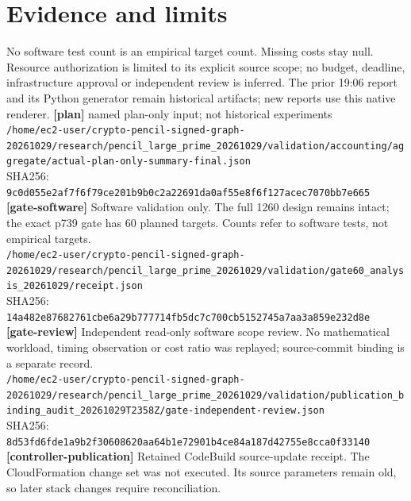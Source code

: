 \documentclass[11pt]{article}
\begin{document}
\section*{Evidence and limits}
No software test count is an empirical target count. Missing costs stay null. Resource authorization is limited to its explicit source scope; no budget, deadline, infrastructure approval or independent review is inferred. The prior 19:06 report and its Python generator remain historical artifacts; new reports use this native renderer.
\small
\textbf{[plan]} named plan-only input; not historical experiments\\
\texttt{/\allowbreak{}home/\allowbreak{}ec2-user/\allowbreak{}crypto-pencil-signed-graph-20261029/\allowbreak{}research/\allowbreak{}pencil\_large\_prime\_20261029/\allowbreak{}validation/\allowbreak{}accounting/\allowbreak{}aggregate/\allowbreak{}actual-plan-only-summary-final.json}\\
SHA256: \texttt{9c0d055e2af7f6f79ce201b9b0c2a22691da0af55e8f6f127acec7070bb7e665}\\
\textbf{[gate-software]} Software validation only. The full 1260 design remains intact; the exact p739 gate has 60 planned targets. Counts refer to software tests, not empirical targets.\\
\texttt{/\allowbreak{}home/\allowbreak{}ec2-user/\allowbreak{}crypto-pencil-signed-graph-20261029/\allowbreak{}research/\allowbreak{}pencil\_large\_prime\_20261029/\allowbreak{}validation/\allowbreak{}gate60\_analysis\_20261029/\allowbreak{}receipt.json}\\
SHA256: \texttt{14a482e87682761cbe6a29b777714fb5dc7c700cb5152745a7aa3a859e232d8e}\\
\textbf{[gate-review]} Independent read-only software scope review. No mathematical workload, timing observation or cost ratio was replayed; source-commit binding is a separate record.\\
\texttt{/\allowbreak{}home/\allowbreak{}ec2-user/\allowbreak{}crypto-pencil-signed-graph-20261029/\allowbreak{}research/\allowbreak{}pencil\_large\_prime\_20261029/\allowbreak{}validation/\allowbreak{}publication\_binding\_audit\_20261029T2358Z/\allowbreak{}gate-independent-review.json}\\
SHA256: \texttt{8d53fd6fde1a9b2f30608620aa64b1e72901b4ce84a187d42755e8cca0f33140}\\
\textbf{[controller-publication]} Retained CodeBuild source-update receipt. The CloudFormation change set was not executed. Its source parameters remain old, so later stack changes require reconciliation.\\
\end{document}

